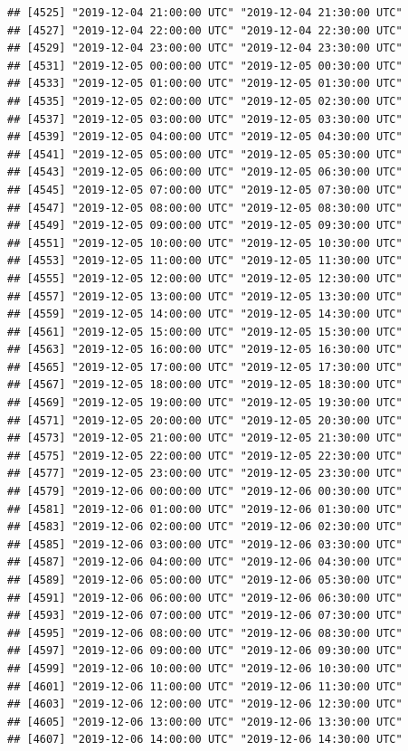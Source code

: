 \documentclass{article}\usepackage[]{graphicx}\usepackage[]{color}
\makeatletter
\newenvironment{kframe}{%
 \def\at@end@of@kframe{}%
 \ifinner\ifhmode%
  \def\at@end@of@kframe{\end{minipage}}%
  \begin{minipage}{\columnwidth}%
 \fi\fi%
 \def\FrameCommand##1{\hskip\@totalleftmargin \hskip-\fboxsep
 \colorbox{shadecolor}{##1}\hskip-\fboxsep
     \hskip-\linewidth \hskip-\@totalleftmargin \hskip\columnwidth}%
 \MakeFramed {\advance\hsize-\width
   \@totalleftmargin\z@ \linewidth\hsize
   \@setminipage}}%
 {\par\unskip\endMakeFramed%
 \at@end@of@kframe}
\newenvironment{knitrout}{}{} %
\makeatother
\begin{document}
\begin{knitrout}
\begin{kframe}
\begin{verbatim}
## [4525] "2019-12-04 21:00:00 UTC" "2019-12-04 21:30:00 UTC"
## [4527] "2019-12-04 22:00:00 UTC" "2019-12-04 22:30:00 UTC"
## [4529] "2019-12-04 23:00:00 UTC" "2019-12-04 23:30:00 UTC"
## [4531] "2019-12-05 00:00:00 UTC" "2019-12-05 00:30:00 UTC"
## [4533] "2019-12-05 01:00:00 UTC" "2019-12-05 01:30:00 UTC"
## [4535] "2019-12-05 02:00:00 UTC" "2019-12-05 02:30:00 UTC"
## [4537] "2019-12-05 03:00:00 UTC" "2019-12-05 03:30:00 UTC"
## [4539] "2019-12-05 04:00:00 UTC" "2019-12-05 04:30:00 UTC"
## [4541] "2019-12-05 05:00:00 UTC" "2019-12-05 05:30:00 UTC"
## [4543] "2019-12-05 06:00:00 UTC" "2019-12-05 06:30:00 UTC"
## [4545] "2019-12-05 07:00:00 UTC" "2019-12-05 07:30:00 UTC"
## [4547] "2019-12-05 08:00:00 UTC" "2019-12-05 08:30:00 UTC"
## [4549] "2019-12-05 09:00:00 UTC" "2019-12-05 09:30:00 UTC"
## [4551] "2019-12-05 10:00:00 UTC" "2019-12-05 10:30:00 UTC"
## [4553] "2019-12-05 11:00:00 UTC" "2019-12-05 11:30:00 UTC"
## [4555] "2019-12-05 12:00:00 UTC" "2019-12-05 12:30:00 UTC"
## [4557] "2019-12-05 13:00:00 UTC" "2019-12-05 13:30:00 UTC"
## [4559] "2019-12-05 14:00:00 UTC" "2019-12-05 14:30:00 UTC"
## [4561] "2019-12-05 15:00:00 UTC" "2019-12-05 15:30:00 UTC"
## [4563] "2019-12-05 16:00:00 UTC" "2019-12-05 16:30:00 UTC"
## [4565] "2019-12-05 17:00:00 UTC" "2019-12-05 17:30:00 UTC"
## [4567] "2019-12-05 18:00:00 UTC" "2019-12-05 18:30:00 UTC"
## [4569] "2019-12-05 19:00:00 UTC" "2019-12-05 19:30:00 UTC"
## [4571] "2019-12-05 20:00:00 UTC" "2019-12-05 20:30:00 UTC"
## [4573] "2019-12-05 21:00:00 UTC" "2019-12-05 21:30:00 UTC"
## [4575] "2019-12-05 22:00:00 UTC" "2019-12-05 22:30:00 UTC"
## [4577] "2019-12-05 23:00:00 UTC" "2019-12-05 23:30:00 UTC"
## [4579] "2019-12-06 00:00:00 UTC" "2019-12-06 00:30:00 UTC"
## [4581] "2019-12-06 01:00:00 UTC" "2019-12-06 01:30:00 UTC"
## [4583] "2019-12-06 02:00:00 UTC" "2019-12-06 02:30:00 UTC"
## [4585] "2019-12-06 03:00:00 UTC" "2019-12-06 03:30:00 UTC"
## [4587] "2019-12-06 04:00:00 UTC" "2019-12-06 04:30:00 UTC"
## [4589] "2019-12-06 05:00:00 UTC" "2019-12-06 05:30:00 UTC"
## [4591] "2019-12-06 06:00:00 UTC" "2019-12-06 06:30:00 UTC"
## [4593] "2019-12-06 07:00:00 UTC" "2019-12-06 07:30:00 UTC"
## [4595] "2019-12-06 08:00:00 UTC" "2019-12-06 08:30:00 UTC"
## [4597] "2019-12-06 09:00:00 UTC" "2019-12-06 09:30:00 UTC"
## [4599] "2019-12-06 10:00:00 UTC" "2019-12-06 10:30:00 UTC"
## [4601] "2019-12-06 11:00:00 UTC" "2019-12-06 11:30:00 UTC"
## [4603] "2019-12-06 12:00:00 UTC" "2019-12-06 12:30:00 UTC"
## [4605] "2019-12-06 13:00:00 UTC" "2019-12-06 13:30:00 UTC"
## [4607] "2019-12-06 14:00:00 UTC" "2019-12-06 14:30:00 UTC"

\end{verbatim}
\end{kframe}
\end{knitrout}
\end{document}
